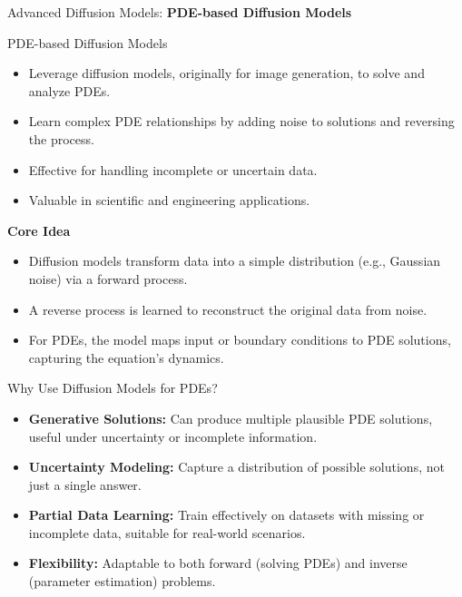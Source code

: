 \begin{frame}{}
    \LARGE Advanced Diffusion Models: \textbf{PDE-based Diffusion Models}
\end{frame}

\begin{frame}[allowframebreaks]{PDE-based Diffusion Models}
    \begin{itemize}
        \item Leverage diffusion models, originally for image generation, to solve and analyze PDEs.
        \item Learn complex PDE relationships by adding noise to solutions and reversing the process.
        \item Effective for handling incomplete or uncertain data.
        \item Valuable in scientific and engineering applications.
    \end{itemize}

    \framebreak

    \textbf{Core Idea}
    \begin{itemize}
        \item Diffusion models transform data into a simple distribution (e.g., Gaussian noise) via a forward process.
        \item A reverse process is learned to reconstruct the original data from noise.
        \item For PDEs, the model maps input or boundary conditions to PDE solutions, capturing the equation's dynamics.
    \end{itemize}
\end{frame}

\begin{frame}{Why Use Diffusion Models for PDEs?}
    \begin{itemize}
        \item \textbf{Generative Solutions:} Can produce multiple plausible PDE solutions, useful under uncertainty or incomplete information.
        \item \textbf{Uncertainty Modeling:} Capture a distribution of possible solutions, not just a single answer.
        \item \textbf{Partial Data Learning:} Train effectively on datasets with missing or incomplete data, suitable for real-world scenarios.
        \item \textbf{Flexibility:} Adaptable to both forward (solving PDEs) and inverse (parameter estimation) problems.
    \end{itemize}
\end{frame}



